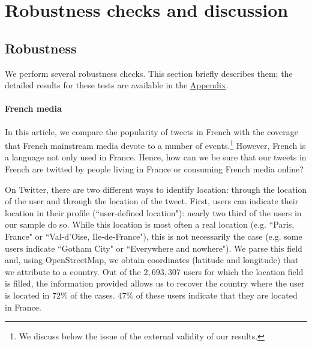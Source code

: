 \section{Robustness checks and discussion\label{Sec:RobustnessDiscussion}}

\subsection{Robustness\label{Sec:Robustness}}

We  perform  several  robustness  checks.  This  section  briefly  describes  them;  the  detailed results for these tests are available in the \hyperlink{ref:Appendix}{Appendix}.


\paragraph{French media}

In this article, we compare the popularity of tweets in French with the coverage that French mainstream media devote to a number of events.\footnote{We discuss below the issue of the external validity of our results.} However, French is a language not only used in France. Hence, how can we be sure that our tweets in French are twitted by people living in France or consuming French media online?

On Twitter, there are two different ways to identify location: through the location of the user and through the location of the tweet. First, users can indicate their location in their profile (``user-defined location"): nearly two third of the users in our sample do so. While this location is most often a real location (e.g. ``Paris, France" or ``Val-d'Oise, Ile-de-France"), this is not necessarily the case (e.g. some users indicate ``Gotham City" or ``Everywhere and nowhere"). We parse this field and, using OpenStreetMap, we obtain coordinates (latitude and longitude) that we attribute to a country. Out of the $2,693,307$ users for which the location field is filled, the information provided allows us to recover the country where the user is located in $72\%$ of the cases. $47\%$ of these users indicate that they are located in France.

